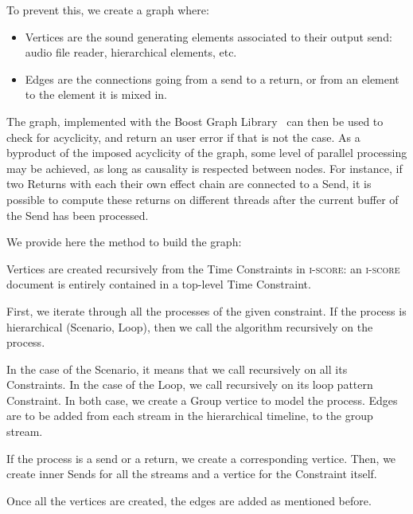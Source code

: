 \documentclass{article}
\newcommand*{\iscore}{\textsc{i-score}\xspace}
\begin{document}
To prevent this, we create a graph where: 
\begin{itemize}
	\item Vertices are the sound generating elements associated to their output send: audio file reader, hierarchical elements, etc.
	\item Edges are the connections going from a send to a return, or from an element to the element it is mixed in.
\end{itemize} 

The graph, implemented with the Boost Graph Library~\cite{siek2001boost} can then be used to 
check for acyclicity, and return an user error if that is not the case.
As a byproduct of the imposed acyclicity of the graph, some level of parallel processing may be achieved, as long as causality is respected between nodes. 
For instance, if two Returns with each their own effect chain are connected to a Send, it is possible to compute these returns on different threads after the current buffer of the Send has been processed.

We provide here the method to build the graph:

Vertices are created recursively from the Time Constraints in \iscore: an \iscore document is entirely contained in a top-level Time Constraint.

First, we iterate through all the processes of the given constraint.
If the process is hierarchical (Scenario, Loop), then we call the algorithm recursively on the process.

In the case of the Scenario, it means that we call recursively on all its Constraints.
In the case of the Loop, we call recursively on its loop pattern Constraint.
In both case, we create a Group vertice to model the process. 
Edges are to be added from each stream in the hierarchical timeline, to the group stream.

If the process is a send or a return, we create a corresponding vertice.
Then, we create inner Sends for all the streams and a vertice for the Constraint itself.

Once all the vertices are created, the edges are added as mentioned before.
\end{document}
